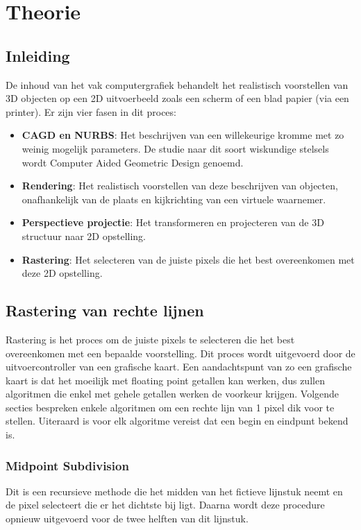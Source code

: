 \documentclass{report}
\begin{document}
	\tableofcontents
	
	\part{Theorie}
	\chapter{Inleiding}
	De inhoud van het vak computergrafiek behandelt het realistisch voorstellen van 3D objecten op een 2D uitvoerbeeld zoals een scherm of een blad papier (via een printer). Er zijn vier fasen in dit proces:
	\begin{itemize}
		\item \textbf{CAGD en NURBS}: Het beschrijven van een willekeurige kromme met zo weinig mogelijk parameters. De studie naar dit soort wiskundige stelsels wordt Computer Aided Geometric Design genoemd.
		\item \textbf{Rendering}: Het realistisch voorstellen van deze beschrijven van objecten, onafhankelijk van de plaats en kijkrichting van een virtuele waarnemer.
		\item \textbf{Perspectieve projectie}: Het transformeren en projecteren van de 3D structuur naar 2D opstelling.
		\item \textbf{Rastering}: Het selecteren van de juiste pixels die het best overeenkomen met deze 2D opstelling. 
	\end{itemize}

	\chapter{Rastering van rechte lijnen}
	Rastering is het proces om de juiste pixels te selecteren die het best overeenkomen met een bepaalde voorstelling. Dit proces wordt uitgevoerd door de uitvoercontroller van een grafische kaart. Een aandachtspunt van zo een grafische kaart is dat het moeilijk met floating point getallen kan werken, dus zullen algoritmen die enkel met gehele getallen werken de voorkeur krijgen. Volgende secties bespreken enkele algoritmen om een rechte lijn van 1 pixel dik voor te stellen. Uiteraard is voor elk algoritme vereist dat een begin en eindpunt bekend is.
	\section{Midpoint Subdivision}
	Dit is een recursieve methode die het midden van het fictieve lijnstuk neemt en de pixel selecteert die er het dichtste bij ligt. Daarna wordt deze procedure opnieuw uitgevoerd voor de twee helften van dit lijnstuk.
	
\end{document}
